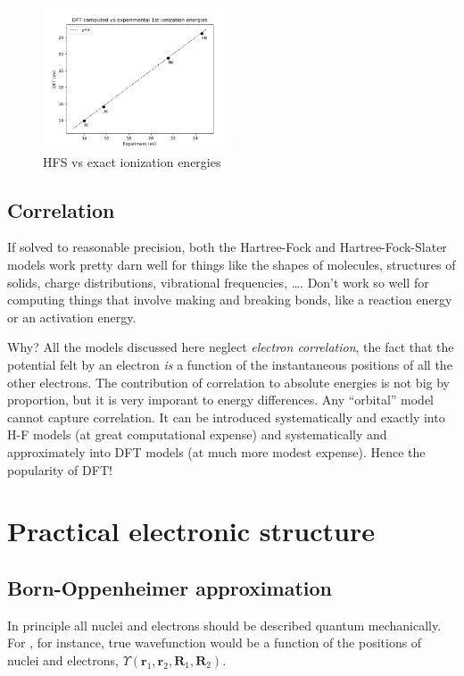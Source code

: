 \documentclass[11pt]{article}
\begin{document}
\begin{figure}[htbp]
\centering
\includegraphics[width=0.5\textwidth]{./Images/Ionization.png}
\caption{HFS vs exact ionization energies}
\end{figure}

\subsection{Correlation}
\label{sec:org497b68d}
If solved to reasonable precision, both the Hartree-Fock and Hartree-Fock-Slater models work pretty darn well for things like the shapes of molecules, structures of solids, charge distributions, vibrational frequencies, \ldots{}.  Don't work so well for computing things that involve making and breaking bonds, like a reaction energy or an activation energy.

Why?  All the models discussed here neglect \emph{electron correlation}, the fact that the
potential felt by an electron \emph{is} a function of the instantaneous positions of all the
other electrons.  The contribution of correlation to absolute energies is not big by
proportion, but it is very imporant to energy differences.  Any ``orbital'' model cannot
capture correlation.  It can be introduced systematically and exactly into H-F models (at
great computational expense) and systematically and approximately into DFT models (at much
more modest expense). Hence the popularity of DFT!

\newpage
\section{Practical electronic structure}
\label{sec:org68a303a}
\subsection{Born-Oppenheimer approximation}
\label{sec:orgc2f5101}
In principle all nuclei and electrons should be described quantum mechanically.  For ,
for instance, true wavefunction would be a function of the positions of nuclei and
electrons, \(\Upsilon(\mathbf{r}_{1}, \mathbf{r}_{2},\mathbf{R}_{1},\mathbf{R}_{2})\).
\end{document}
